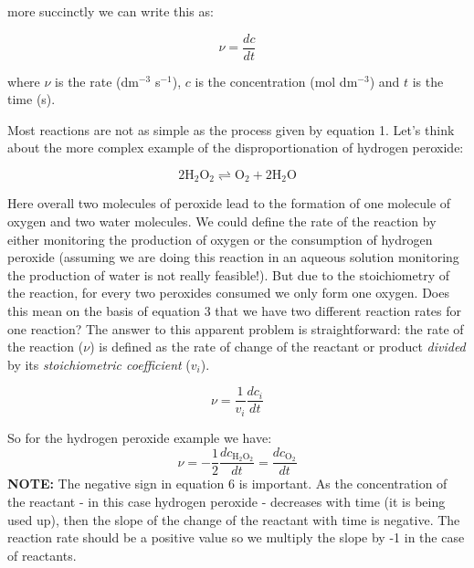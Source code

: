 \documentclass[	DIV=calc,%
							paper=a4,%
							fontsize=11pt,%
							twocolumn]{scrartcl}	 					%
\begin{document}
\noindent more succinctly we can write this as:

\begin{equation}
    \nu = \frac{d c}{d t} 
\end{equation}

\noindent where $\nu$ is the rate (dm$^{-3}$ s$^{-1}$), $c$ is the concentration (mol dm$^{-3}$) and $t$ is the time (s).

Most reactions are not as simple as the process given by equation 1. Let's think about the more complex example of the disproportionation of hydrogen peroxide:

\begin{equation}
    2\mathrm{H_2O_2} \rightleftharpoons \mathrm{O_2} + 2\mathrm{H_2O}
    \label{peroxreac}
\end{equation}

\noindent Here overall two molecules of peroxide lead to the formation of one molecule of oxygen and two water molecules. We could define the rate of the reaction by either monitoring the production of oxygen or the consumption of hydrogen peroxide (assuming we are doing this reaction in an aqueous solution monitoring the production of water is not really feasible!). But due to the stoichiometry of the reaction, for every two peroxides consumed we only form one oxygen. Does this mean on the basis of equation 3 that we have two different reaction rates for one reaction? The answer to this apparent problem is straightforward: the rate of the reaction ($\nu$) is defined as the rate of change of the reactant or product \emph{divided} by its \emph{stoichiometric coefficient} ($v_i$).
\begin{tcolorbox}[title=Definition: Reaction Rate]
    \begin{equation}
        \nu = \frac{1}{v_i}\frac{dc_i}{dt}
        \label{eq:reacrate}
    \end{equation}
\end{tcolorbox}

\noindent So for the hydrogen peroxide example we have:
\begin{equation}
    \nu = -\frac{1}{2}\frac{dc_\mathrm{H_2O_2}}{dt} = \frac{dc_\mathrm{O_2}}{dt}
\end{equation}
\textbf{NOTE:} The negative sign in equation 6 is important. As the concentration of the reactant - in this case hydrogen peroxide - decreases with time (it is being used up), then the slope of the change of the reactant with time is negative. The reaction rate should be a positive value so we multiply the slope by -1 in the case of reactants. 
\end{document}
